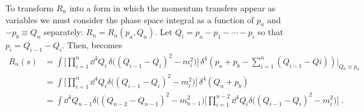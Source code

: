 To transform $R_n$ into a form in which the momentum transfers appear as variables we must consider the phase space integral as a function of $p_a$ and $-p_b \equiv Q_n$ separately: $R_n = R_n(p_a, Q_n)$. 
Let $Q_i = p_a - p_1 - \cdots - p_i$ so that $p_i = Q_{i-1} - Q_i$. 
Then,  becomes
\reversemarginpar{}
\begin{equation}
    \label{eq:phase-space-integral-with-momentum-transfer}
    \begin{aligned}
        R_n(s) 
        &= \int \bigg[
            \prod_{i=1}^{n}
            \dd^4 Q_i \,
            \delta \big( 
                        (Q_{i-1} - Q_i)^2 - m_i^2
                    \big)
            \bigg] \,
            \delta^4 ( p_a + p_b - \sum_{i=1}^{n} (Q_{i - 1} - Q{i})) \vert_{Q_0 \equiv p_a} \\
        &= \int \bigg[
            \prod_{i=1}^{n}
            \dd^4 Q_i
            \delta \big( 
                        (Q_{i-1} - Q_i)^2 - m_i^2
                    \big)
            \bigg] \,
            \delta^4 ( Q_n + p_b) \\
        &= \int 
            \dd^4 Q_{n-1} 
            \delta \big( 
                        (Q_{n-2} - Q_{n-1})^2 - m_{n-1}^2
                    \big) 
            \bigg[
            \prod_{i=1}^{n-2}
            \dd^4 Q_i
            \delta \big( 
                        (Q_{i-1} - Q_i)^2 - m_i^2
                    \big)
            \bigg] \; .
    \end{aligned}
\end{equation}

